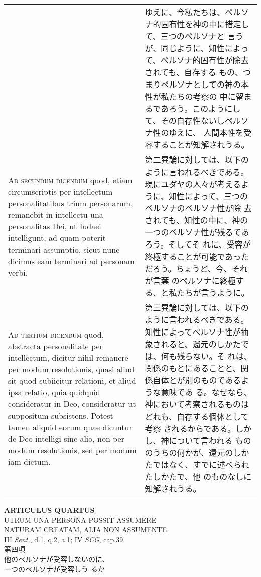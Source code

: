 \documentclass[10pt]{jsarticle} %
\begin{document}
\begin{longtable}{p{21em}p{21em}}
&

ゆえに、今私たちは、ペルソナ的固有性を神の中に措定して、三つのペルソナと
 言うが、同じように、知性によって、ペルソナ的固有性が除去されても、自存する
 もの、つまりペルソナとしての神の本性が私たちの考察の
 中に留まるであろう。このようにして、その自存性ないしペルソナ性のゆえに、
 人間本性を受容することが知解されうる。



\\



{\scshape Ad secundum dicendum} quod, etiam circumscriptis per intellectum
personalitatibus trium personarum, remanebit in intellectu una
personalitas Dei, ut Iudaei intelligunt, ad quam poterit terminari
assumptio, sicut nunc dicimus eam terminari ad personam verbi.


&

第二異論に対しては、以下のように言われるべきである。
現にユダヤの人々が考えるように、知性によって、三つのペルソナのペルソナ性が除
 去されても、知性の中に、神の一つのペルソナ性が残るであろう。そしてそ
 れに、受容が終極することが可能であっただろう。ちょうど、今、それが言葉
 のペルソナに終極する、と私たちが言うように。


\\



{\scshape Ad tertium dicendum} quod, abstracta personalitate per intellectum,
dicitur nihil remanere per modum resolutionis, quasi aliud sit quod
subiicitur relationi, et aliud ipsa relatio, quia quidquid consideratur
in Deo, consideratur ut suppositum subsistens. Potest tamen aliquid
eorum quae dicuntur de Deo intelligi sine alio, non per modum
resolutionis, sed per modum iam dictum.


&

第三異論に対しては、以下のように言われるべきである。
知性によってペルソナ性が抽象されると、還元のしかたでは、何も残らない。そ
 れは、関係のもとにあることと、関係自体とが別のものであるような意味であ
 る。なぜなら、神において考察されるものはどれも、自存する個体として考察
 されるからである。しかし、神について言われる
 もののうちの何かが、還元のしかたではなく、すでに述べられたしかたで、他
 のものなしに知解されうる。



\end{longtable}
\newpage





\begin{center}
 {\Large {\bf ARTICULUS QUARTUS}}\\
 {\large UTRUM UNA PERSONA POSSIT ASSUMERE\\NATURAM CREATAM, ALIA NON ASSUMENTE}\\
 {\footnotesize III {\itshape Sent.}, d.1, q.2, a.1; IV {\itshape SCG}, cap.39.}\\
 {\Large 第四項\\他のペルソナが受容しないのに、\\一つのペルソナが受容しう
 るか}
\end{center}
\end{document}
